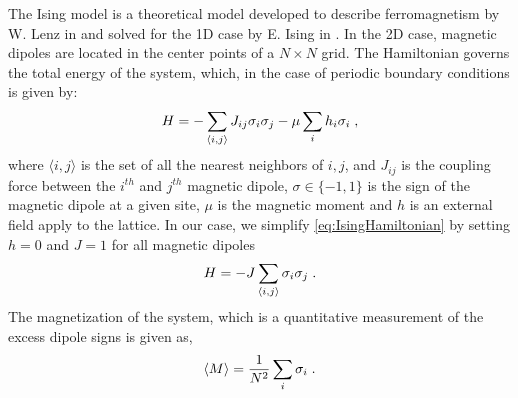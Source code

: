 \documentclass[11pt, authoryear]{elsarticle}
\begin{document}
\begin{appendix}
		The Ising model is a theoretical model developed to describe ferromagnetism by W. Lenz in \citep{Lenz} and solved for the 1D case by E. Ising in \citep{Ising1925}.
		In the 2D case, magnetic dipoles are located in the center points of a $N \times N$ grid. 
		The Hamiltonian governs the total energy of the system, which, in the case of periodic 
		boundary conditions is given by:
		\begin{equation}
			\centering
			H = -\sum_{\langle i,j \rangle }J_{ij}\sigma_i\sigma_j - \mu\sum_i h_i \sigma_i\;,
			\label{eq:IsingHamiltonian}
		\end{equation}
		where $\langle i,j \rangle $ is the set of all the nearest neighbors of $i, j$, and $J_{ij}$ is the coupling force between the $i^{th}$ and $j^{th}$ magnetic dipole, $\sigma \in \{-1, 1\}$  is the sign of the magnetic dipole at a given site, $\mu$ is the magnetic moment and $h$ is an external field apply to the lattice.
		In our case, we simplify \cref{eq:IsingHamiltonian} by setting $h=0$ and $J=1$ for all magnetic dipoles
		\begin{equation}
			\centering
			H = -J\sum_{\langle i,j \rangle }\sigma_i\sigma_j\;.
			\label{eq:IsingSimple}
		\end{equation}
		The magnetization of the system, which is a quantitative measurement of the excess dipole signs
		is given as, 
		\begin{equation}
			\centering
			\langle M \rangle= \frac{1}{N^2}\sum_{i}\sigma_i \;.
			\label{eq:magnetization}
		\end{equation}
		

\end{appendix}
\end{document}
